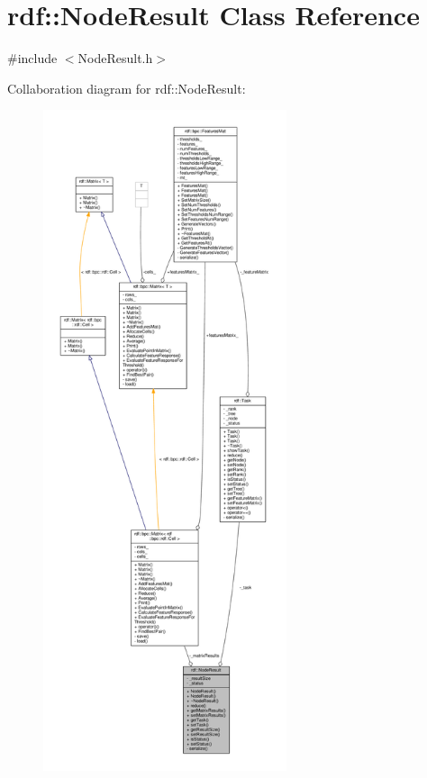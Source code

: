 \hypertarget{classrdf_1_1NodeResult}{}\section{rdf\+:\+:Node\+Result Class Reference}
\label{classrdf_1_1NodeResult}


{\ttfamily \#include $<$Node\+Result.\+h$>$}



Collaboration diagram for rdf\+:\+:Node\+Result\+:
\nopagebreak
\begin{figure}[H]
\begin{center}
\leavevmode
\includegraphics[height=550pt]{classrdf_1_1NodeResult__coll__graph}
\end{center}
\end{figure}
